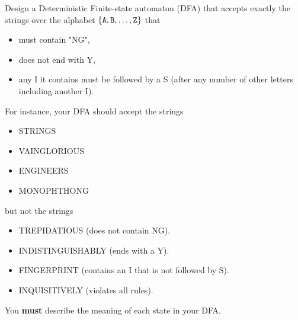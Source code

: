 \item[8] Design a Deterministic Finite-state automaton (DFA)  that accepts  exactly the
  strings over the  alphabet $\{ \verb@A@, \verb@B@, \ldots, \verb@Z@  \}$ that
  \begin{itemize}
      \item must contain "NG",
      \item does not end with Y,
      \item any I it contains must be followed by a S (after any number of other letters including another I).
  \end{itemize}
  For instance, your DFA should accept the strings
  \begin{itemize}
  \item STRINGS
  \item VAINGLORIOUS
  \item ENGINEERS
  \item MONOPHTHONG
  \end{itemize}
  but not the strings
  \begin{itemize}
  \item TREPIDATIOUS (does not contain NG).
  \item INDISTINGUISHABLY (ends with a Y).
  \item FINGERPRINT (contains an I that is not followed by S).
  \item INQUISITIVELY (violates all rules).
  \end{itemize}
  You \textbf{must} describe the  meaning of each state in your DFA.
  
